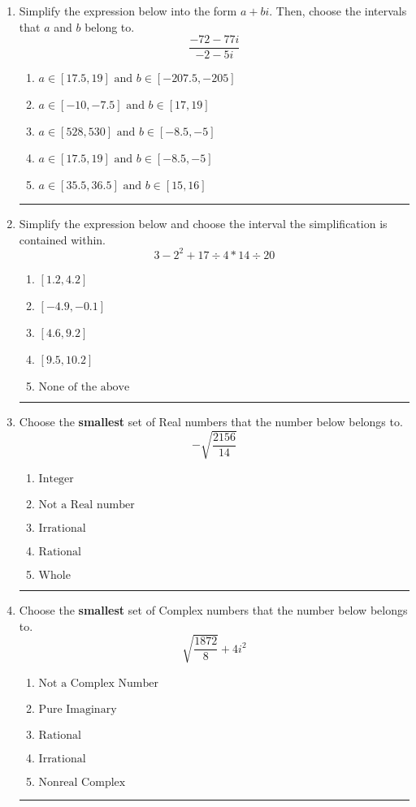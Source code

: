 \documentclass[14pt]{extbook}
\newcommand{\litem}[1]{\item#1\hspace*{-1cm}\rule{\textwidth}{0.4pt}}
\begin{document}
\begin{enumerate}
{\begin{enumerate}[label=\Alph*.]
\end{enumerate} }
\litem{
Simplify the expression below into the form $a+bi$. Then, choose the intervals that $a$ and $b$ belong to.\[ \frac{-72 - 77 i}{-2 - 5 i} \]\begin{enumerate}[label=\Alph*.]
\item \( a \in [17.5, 19] \text{ and } b \in [-207.5, -205] \)
\item \( a \in [-10, -7.5] \text{ and } b \in [17, 19] \)
\item \( a \in [528, 530] \text{ and } b \in [-8.5, -5] \)
\item \( a \in [17.5, 19] \text{ and } b \in [-8.5, -5] \)
\item \( a \in [35.5, 36.5] \text{ and } b \in [15, 16] \)

\end{enumerate} }
\litem{
Simplify the expression below and choose the interval the simplification is contained within.\[ 3 - 2^2 + 17 \div 4 * 14 \div 20 \]\begin{enumerate}[label=\Alph*.]
\item \( [1.2, 4.2] \)
\item \( [-4.9, -0.1] \)
\item \( [4.6, 9.2] \)
\item \( [9.5, 10.2] \)
\item \( \text{None of the above} \)

\end{enumerate} }
\litem{
Choose the \textbf{smallest} set of Real numbers that the number below belongs to.\[ -\sqrt{\frac{2156}{14}} \]\begin{enumerate}[label=\Alph*.]
\item \( \text{Integer} \)
\item \( \text{Not a Real number} \)
\item \( \text{Irrational} \)
\item \( \text{Rational} \)
\item \( \text{Whole} \)

\end{enumerate} }
\litem{
Choose the \textbf{smallest} set of Complex numbers that the number below belongs to.\[ \sqrt{\frac{1872}{8}}+4i^2 \]\begin{enumerate}[label=\Alph*.]
\item \( \text{Not a Complex Number} \)
\item \( \text{Pure Imaginary} \)
\item \( \text{Rational} \)
\item \( \text{Irrational} \)
\item \( \text{Nonreal Complex} \)


\end{enumerate}}
\end{enumerate}
\end{document}
